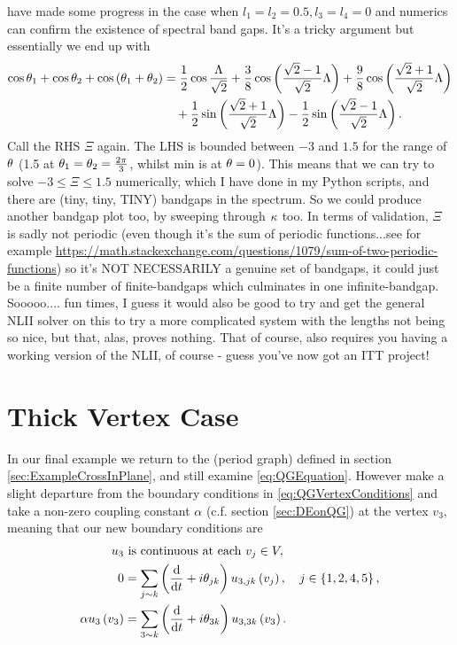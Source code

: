 have made some progress in the case when $l_1=l_2=0.5, l_3=l_4=0$ and numerics can confirm the existence of spectral band gaps. 
It's a tricky argument but essentially we end up with
\begin{align*}
	\cos\theta_1 + \cos\theta_2 + \cos\left( \theta_1+\theta_2 \right) &=
	\frac{1}{2}\cos\frac{\Lambda}{\sqrt{2}}
	+ \frac{3}{8}\cos\left( \frac{\sqrt{2}-1}{\sqrt{2}}\Lambda \right)
	+ \frac{9}{8}\cos\left( \frac{\sqrt{2}+1}{\sqrt{2}}\Lambda \right) \\
	&\quad + \frac{1}{2}\sin\left( \frac{\sqrt{2}+1}{\sqrt{2}}\Lambda \right)
	- \frac{1}{2}\sin\left( \frac{\sqrt{2}-1}{\sqrt{2}}\Lambda \right).
\end{align*}
Call the RHS $\Xi$ again.
The LHS is bounded between $-3$ and $1.5$ for the range of $\theta$ (1.5 at $\theta_1=\theta_2=\frac{2\pi}{3}$, whilst min is at $\theta=0$).
This means that we can try to solve $-3\leq \Xi\leq 1.5$ numerically, which I have done in my Python scripts, and there are (tiny, tiny, TINY) bandgaps in the spectrum.
So we could produce another bandgap plot too, by sweeping through $\kappa$ too.
In terms of validation, $\Xi$ is sadly not periodic (even though it's the sum of periodic functions...see for example \url{https://math.stackexchange.com/questions/1079/sum-of-two-periodic-functions}) so it's NOT NECESSARILY a genuine set of bandgaps, it could just be a finite number of finite-bandgaps which culminates in one infinite-bandgap.
Sooooo.... fun times, I guess it would also be good to try and get the general NLII solver on this to try a more complicated system with the lengths not being so nice, but that, alas, proves nothing.
That of course, also requires you having a working version of the NLII, of course - guess you've now got an ITT project!

\section{Thick Vertex Case} \label{sec:ExampleThickVertex}
In our final example we return to the (period graph) defined in section \ref{sec:ExampleCrossInPlane}, and still examine \eqref{eq:QGEquation}.
However make a slight departure from the boundary conditions in \eqref{eq:QGVertexConditions} and take a non-zero coupling constant $\alpha$ (c.f. section \ref{sec:DEonQG}) at the vertex $v_3$, meaning that our new boundary conditions are
\begin{align} \label{eq:QGThickVertexConditions}
		u_3 &\text{ is continuous at each } v_j\in V, \\
		0 &= \sum_{j\sim k} \left( \dfrac{\mathrm{d}}{\mathrm{d}t} + i\theta_{jk} \right)u_{3,jk}\left( v_j \right), \quad j\in\left\{ 1,2,4,5 \right\}, \\
		\alpha u_3\left( v_3 \right) &= \sum_{3\sim k} \left( \dfrac{\mathrm{d}}{\mathrm{d}t} + i\theta_{3k} \right)u_{3,3k}\left( v_3 \right).
\end{align}

